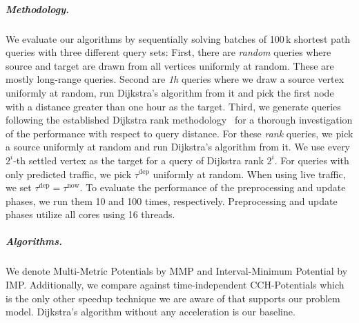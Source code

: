 \documentclass[a4paper,UKenglish,cleveref, autoref, thm-restate,anonymous]{lipics-v2021}
\newcommand*{\tdep}{\tau^{\operatorname{dep}}}
\begin{document}

\subparagraph{Methodology.}
We evaluate our algorithms by sequentially solving batches of 100\,k shortest path queries with three different query sets:
First, there are \emph{random} queries where source and target are drawn from all vertices uniformly at random.
These are mostly long-range queries.
Second are \emph{1h} queries where we draw a source vertex uniformly at random, run Dijkstra's algorithm from it and pick the first node with a distance greater than one hour as the target.
Third, we generate queries following the established Dijkstra rank methodology~\cite{ss-hhhes-05} for a thorough investigation of the performance with respect to query distance.
For these \emph{rank} queries, we pick a source uniformly at random and run Dijkstra's algorithm from it.
We use every $2^{i}$-th settled vertex as the target for a query of Dijkstra rank $2^i$.
For queries with only predicted traffic, we pick $\tdep$ uniformly at random.
When using live traffic, we set $\tdep = \tau^{\operatorname{now}}$.
To evaluate the performance of the preprocessing and update phases, we run them 10 and 100 times, respectively.
Preprocessing and update phases utilize all cores using 16 threads.

\subparagraph{Algorithms.}
We denote Multi-Metric Potentials by MMP and Interval-Minimum Potential by IMP.
Additionally, we compare against time-independent CCH-Potentials which is the only other speedup technique we are aware of that supports our problem model.
Dijkstra's algorithm without any acceleration is our baseline.
\end{document}
